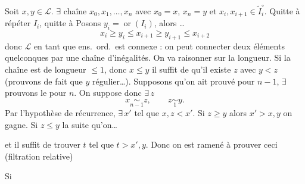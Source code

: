 \documentclass[11pt,a4paper]{article}
\begin{document}
Soit $x, y \in \mathcal{L}$. $\exists$ chaîne $x_0, x_1, \ldots, x_n$ avec $x_0 = x$, $x_n = y$ et $x_i, x_{i+1} \in \widetilde{I}_i^{\circ}$. \struck{\ill{}} Quitte à répéter $I_i$, \struck{\ill{}} quitte à \ill{} Posons $y_i = \operatorname{or}(I_i)$, alors \ldots
\[
  x_i \geqslant y_i \leqslant x_{i+1} \geqslant y_{i+1} \leqslant x_{i+2}
\]
donc $\mathcal{L}$ en tant que ens.\ ord.\ est connexe : on peut connecter deux éléments quelconques par une chaîne d'inégalités. On va raisonner sur la longueur. Si la chaîne est de longueur $\leq 1$, donc $x \leq y$ il suffit de   qu'il existe $z$ avec $y < z$ (prouvons de fait que $y$ régulier\ldots). Supposons qu'on ait prouvé pour $n-1$, \struck{\ill{}} $\exists$ prouvons le pour $n$. \struck{\ill{}} On suppose donc $\exists\, z$
\[
  x \underset{n-1}{\sim} z, \qquad z \underset{1}{\sim} y .
\]
Par l'hypothèse de récurrence, $\exists\, x'$ tel que \struck{\ill{}} $x, z < x'$. Si $z \geq y$ alors $x' > x, y$ on gagne. Si $z \leq y$ la suite qu'on\ldots
{}



et il suffit de trouver $t$ tel que $t > x', y$. Donc on est ramené à prouver ceci (filtration relative)

Si

\end{document}
